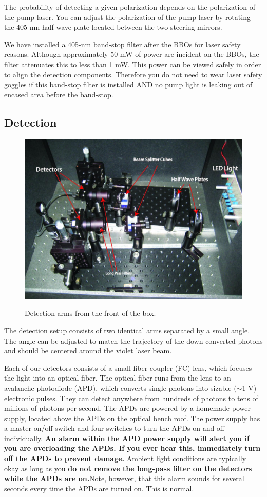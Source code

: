 \documentclass{../lab}
\begin{document}
The probability of detecting a given polarization depends on the polarization of the pump laser. You can adjust the polarization of the pump laser by rotating the 405-nm half-wave plate located between the two steering mirrors.

We have installed a 405-nm band-stop filter after the BBOs for laser safety reasons. Although approximately 50 mW of power are incident on the BBOs, the filter attenuates this to less than 1 mW. This power can be viewed safely in order to align the detection components. Therefore you do not need to wear laser safety goggles if this band-stop filter is installed AND no pump light is leaking out of encased area before the band-stop.

\subsection{Detection}

\begin{figure}[h]
    \centering
    \href{http://experimentationlab.berkeley.edu/sites/default/files/images/IMG_4032.jpg}{\includegraphics[width=0.6\linewidth]{images/IMG_4032.jpg}}
    \caption{Detection arms from the front of the box.}
    \label{fig:IMG_4032}
\end{figure}

The detection setup consists of two identical arms separated by a small angle. The angle can be adjusted to match the trajectory of the down-converted photons and should be centered around the violet laser beam.

Each of our detectors consists of a small fiber coupler (FC) lens, which focuses the light into an optical fiber. The optical fiber runs from the lens to an avalanche photodiode (APD), which converts single photons into sizable ($\sim$1 V) electronic pulses. They can detect anywhere from hundreds of photons to tens of millions of photons per second. The APDs are powered by a homemade power supply, located above the APDs on the optical bench roof. The power supply has a master on/off switch and four switches to turn the APDs on and off individually. \textbf{An alarm within the APD power supply will alert you if you are overloading the APDs. If you ever hear this, immediately turn off the APDs to prevent damage.} Ambient light conditions are typically okay as long as you \textbf{do not remove the long-pass filter on the detectors while the APDs are on.}Note, however, that this alarm sounds for several seconds every time the APDs are turned on. This is normal.
\end{document}
